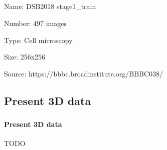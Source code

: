 \subsection{\slidetitle}
\begin{frame}
  \frametitle{\sectiontitle}
  \framesubtitle{\slidetitle}

  \begin{minipage}[h!]{0.40\textwidth}
    Name: DSB2018 stage1_train

    Number: 497 images

  \end{minipage}\hfill
  \begin{minipage}[h!]{0.40\textwidth}
    Type: Cell microscopy

    Size: 256x256

  \end{minipage}

  \bigskip

  Source: https://bbbc.broadinstitute.org/BBBC038/

\end{frame}

\iffalse
\def\slidetitle{Present 3D data}

\subsection{\slidetitle}
\begin{frame}
  \frametitle{\sectiontitle}
  \framesubtitle{\slidetitle}

  TODO

\end{frame}

\def\slidetitle{Benchmark 3D data}

